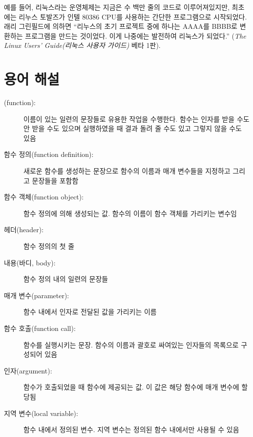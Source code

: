 \documentclass[10pt]{book}
\begin{document}
예를 들어, 리눅스라는 운영체제는 지금은 수 백만 줄의 코드로
이루어져있지만, 최초에는 리누스 토발즈가 인텔 80386 CPU를 사용하는
간단한 프로그램으로 시작되었다.  래리 그린필드에 의하면 ``리누스의 초기
프로젝트 중에 하나는 AAAA를 BBBB로 변환하는 프로그램을 만드는
것이었다.  이게 나중에는 발전하여 리눅스가 되었다.''  ({\em The Linux
  Users' Guide(리눅스 사용자 가이드)} 베타 1판).


\section{용어 해설}

\begin{description}

\item[(function):] 이름이 있는 일련의 문장들로 유용한 작업을 수행한다.
  함수는 인자를 받을 수도 안 받을 수도 있으며 실행하였을 때 결과 돌려
  줄 수도 있고 그렇지 않을 수도 있음

\item[함수 정의(function definition):] 새로운 함수를 생성하는 문장으로
  함수의 이름과 매개 변수들을 지정하고 그리고 문장들을 포함함

\item[함수 객체(function object):] 함수 정의에 의해 생성되는 값.
  함수의 이름이 함수 객체를 가리키는 변수임 

\item[헤더(header):] 함수 정의의 첫 줄 

\item[내용(바디, body):] 함수 정의 내의 일련의 문장들

\item[매개 변수(parameter):] 함수 내에서 인자로 전달된 값을 가리키는 이름

\item[함수 호출(function call):] 함수를 실행시키는 문장.  함수의 이름과
  괄호로 싸여있는 인자들의 목록으로 구성되어 있음

\item[인자(argument):] 함수가 호출되었을 때 함수에 제공되는 값.  이
  값은 해당 함수에 매개 변수에 할당됨

\item[지역 변수(local variable):] 함수 내에서 정의된 변수.  지역 변수는
  정의된 함수 내에서만 사용될 수 있음


\end{description}
\end{document}
